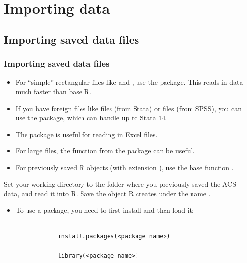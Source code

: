 \documentclass{beamer}
\begin{document}
\section{Importing data}

\subsection{Importing saved data files}

\begin{frame}%
 \frametitle{Importing saved data files}
 	
 	\begin{itemize}
 	    \item 
 	    For ``simple'' rectangular files like  and , use the  package. This reads in data much faster than base R.
 	    \item 
 	    If you have foreign files like  files (from Stata) or  files (from SPSS), you can use the  package, which can handle up to Stata 14.
 	    \item
 	    The  package is useful for reading in Excel files.
 	    \item 
 	    For large files, the function  from the  package can be useful.
 	    \item
 	    For previously saved R objects (with extension ), use the base function .
 	    \vfill
 	\end{itemize}
	
	\begin{myexc}
	\fontsize{10pt}{13}\selectfont
	    Set your working directory to the folder where you previously saved the ACS data, and read it into R. Save the object R creates under the name .
	    \begin{itemize}
	        \item
	        To use a package, you need to first install and then load it:
	        \scriptsize
            \begin{verbatim}
            
            install.packages(<package name>)
            
            library(<package name>)
            \end{verbatim}
	    \end{itemize}
	\addtocounter{exccounter}{1}
	\end{myexc}
	
\end{frame}
\end{document}
